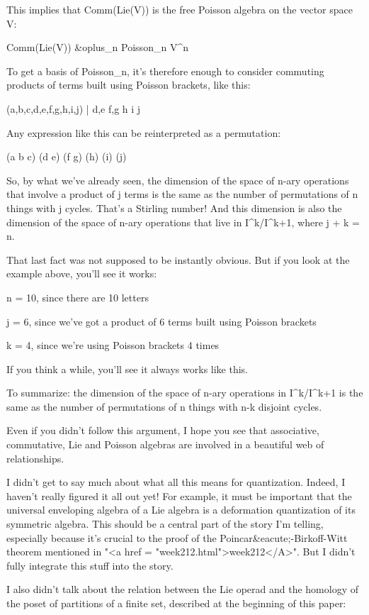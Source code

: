 This implies that Comm(Lie(V)) is the free Poisson algebra on
the vector space V:

Comm(Lie(V)) \cong  &oplus_{n} Poisson_{n} \otimes 
V^{\otimes n}

To get a basis of Poisson_{n}, it's therefore enough to consider
commuting products of terms built using Poisson brackets, like this:

(a,b,c,d,e,f,g,h,i,j) | {d,e} {f,g} h i j

Any expression like this can be reinterpreted as a permutation:

(a b c) (d e) (f g) (h) (i) (j)

So, by what we've already seen, the dimension of the space of n-ary
operations that involve a product of j terms is the same as the number
of permutations of n things with j cycles.  That's a Stirling number!
And this dimension is also the dimension of the space of n-ary
operations that live in I^{k}/I^{k+1}, where j + k = n.  

That last fact was not supposed to be instantly obvious.  But if you
look at the example above, you'll see it works:

n = 10, since there are 10 letters

j = 6, since we've got a product of 6 terms built using Poisson
brackets

k = 4, since we're using Poisson brackets 4 times

If you think a while, you'll see it always works like this.

To summarize: the dimension of the space of n-ary operations in
I^{k}/I^{k+1} is the same as the number of permutations of n
things with n-k disjoint cycles.  

Even if you didn't follow this argument, I hope you see that
associative, commutative, Lie and Poisson algebras are involved in a
beautiful web of relationships.  

I didn't get to say much about what all this means for quantization.
Indeed, I haven't really figured it all out yet!  For example, it must
be important that the universal enveloping algebra of a Lie algebra is
a deformation quantization of its symmetric algebra.  This should be a
central part of the story I'm telling, especially because it's crucial
to the proof of the Poincar&eacute;-Birkoff-Witt theorem mentioned in
"<a href = "week212.html">week212</A>".  But I didn't fully
integrate this stuff into the story.

I also didn't talk about the relation between the Lie operad and
the homology of the poset of partitions of a finite set, described
at the beginning of this paper:

